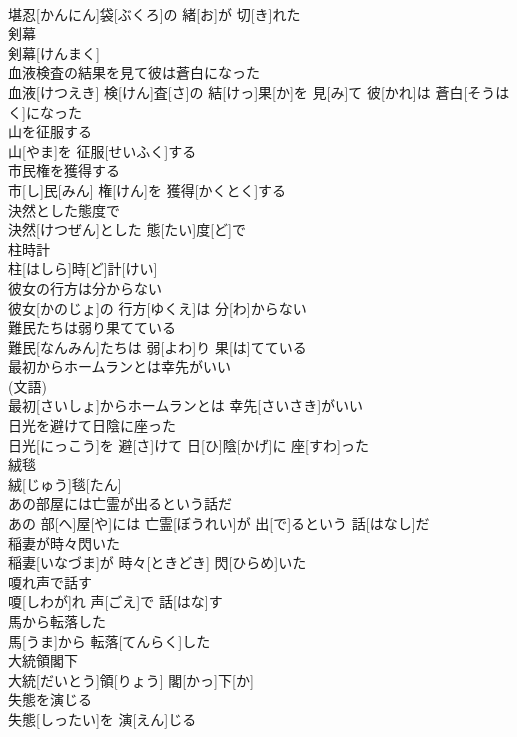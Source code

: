\documentclass[8pt]{extreport}
\begin{document}
\begin{CJK}{UTF8}{min}
\\	堪忍[かんにん]袋[ぶくろ]の 緒[お]が 切[き]れた
\\	剣幕	
\\	剣幕[けんまく]
\\	血液検査の結果を見て彼は蒼白になった	
\\	血液[けつえき] 検[けん]査[さ]の 結[けっ]果[か]を 見[み]て 彼[かれ]は 蒼白[そうはく]になった
\\	山を征服する	
\\	山[やま]を 征服[せいふく]する
\\	市民権を獲得する	
\\	市[し]民[みん] 権[けん]を 獲得[かくとく]する
\\	決然とした態度で	
\\	決然[けつぜん]とした 態[たい]度[ど]で
\\	柱時計	
\\	柱[はしら]時[ど]計[けい]
\\	彼女の行方は分からない	
\\	彼女[かのじょ]の 行方[ゆくえ]は 分[わ]からない
\\	難民たちは弱り果てている	
\\	難民[なんみん]たちは 弱[よわ]り 果[は]てている
\\	最初からホームランとは幸先がいい	
\\	(文語) 
\\	最初[さいしょ]からホームランとは 幸先[さいさき]がいい
\\	日光を避けて日陰に座った	
\\	日光[にっこう]を 避[さ]けて 日[ひ]陰[かげ]に 座[すわ]った
\\	絨毯	
\\	絨[じゅう]毯[たん]
\\	あの部屋には亡霊が出るという話だ	
\\	あの 部[へ]屋[や]には 亡霊[ぼうれい]が 出[で]るという 話[はなし]だ
\\	稲妻が時々閃いた	
\\	稲妻[いなづま]が 時々[ときどき] 閃[ひらめ]いた
\\	嗄れ声で話す	
\\	嗄[しわが]れ 声[ごえ]で 話[はな]す
\\	馬から転落した	
\\	馬[うま]から 転落[てんらく]した
\\	大統領閣下	
\\	大統[だいとう]領[りょう] 閣[かっ]下[か]
\\	失態を演じる	
\\	失態[しったい]を 演[えん]じる

\end{CJK}
\end{document}
